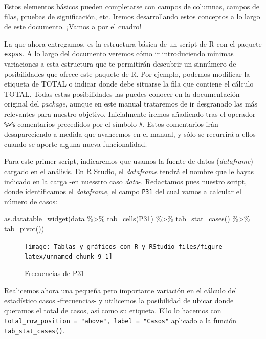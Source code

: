 \documentclass[
]{book}
\newenvironment{Shaded}{\begin{snugshade}}{\end{snugshade}}
\newcommand{\FunctionTok}[1]{\textcolor[rgb]{0.00,0.00,0.00}{#1}}
\newcommand{\NormalTok}[1]{#1}
\newcommand{\SpecialCharTok}[1]{\textcolor[rgb]{0.00,0.00,0.00}{#1}}
\begin{document}
Estos elementos básicos pueden completarse con campos de columnas, campos de filas, pruebas de significación, etc. Iremos desarrollando estos conceptos a lo largo de este documento. ¡Vamos a por el cuadro!

La que ahora entregamos, es la estructura básica de un script de R con el paquete \texttt{expss}. A lo largo del documento veremos cómo ir introduciendo mínimas variaciones a esta estructura que te permitirán descubrir un sinnúmero de posibilidades que ofrece este paquete de R. Por ejemplo, podemos modificar la etiqueta de TOTAL o indicar donde debe situarse la fila que contiene el cálculo TOTAL. Todas estas posibilidades las puedes conocer en la documentación original del \emph{package}, aunque en este manual trataremos de ir desgranado las más relevantes para nuestro objetivo. Inicialmente iremos añadiendo tras el operador \texttt{\%\textgreater{}\%} comentarios precedidos por el símbolo \texttt{\#}. Estos comentarios irán desapareciendo a medida que avancemos en el manual, y sólo se recurrirá a ellos cuando se aporte alguna nueva funcionalidad.

Para este primer script, indicaremos que usamos la fuente de datos (\emph{dataframe}) cargado en el análisis. En R Studio, el \emph{dataframe} tendrá el nombre que le hayas indicado en la carga -en nuesstro caso \emph{data}-. Redactamos pues nuestro script, donde identificamos el \emph{dataframe}, el campo \texttt{P31} del cual vamos a calcular el número de casos:

\begin{Shaded}
\begin{Highlighting}[]
\FunctionTok{as.datatable\_widget}\NormalTok{(data }\SpecialCharTok{\%\textgreater{}\%} \FunctionTok{tab\_cells}\NormalTok{(P31) }\SpecialCharTok{\%\textgreater{}\%} \FunctionTok{tab\_stat\_cases}\NormalTok{() }\SpecialCharTok{\%\textgreater{}\%} 
  \FunctionTok{tab\_pivot}\NormalTok{())}
\end{Highlighting}
\end{Shaded}

\begin{figure}[H]

{\centering \texttt{[image: Tablas-y-gráficos-con-R-y-RStudio\_files/figure-latex/unnamed-chunk-9-1]} 

}

\caption{Frecuencias de P31}\label{fig:unnamed-chunk-9}
\end{figure}

Realicemos ahora una pequeña pero importante variación en el cálculo del estadístico casos -frecuencias- y utilicemos la posibilidad de ubicar donde queramos el total de casos, así como su etiqueta. Ello lo hacemos con \texttt{total\_row\_position\ =\ "above",\ label\ =\ "Casos"} aplicado a la función \texttt{tab\_stat\_cases()}.
\end{document}
